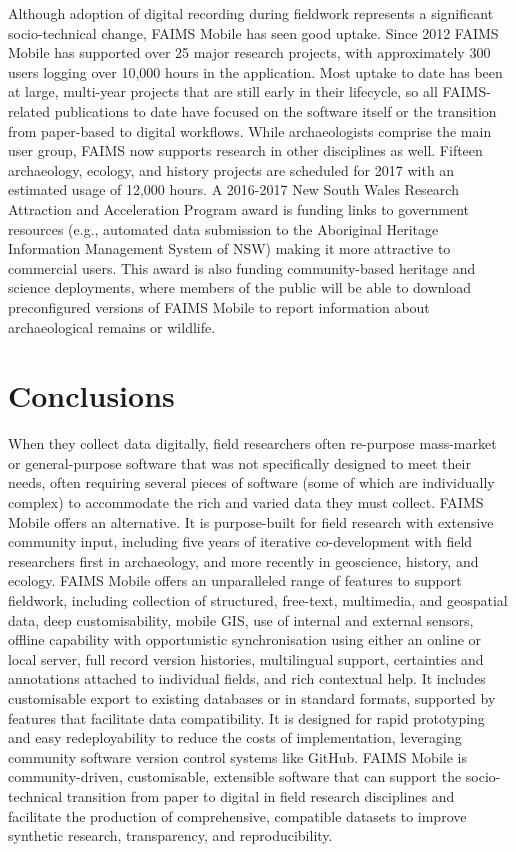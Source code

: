 \documentclass[preprint,12pt, a4paper]{elsarticle}
\begin{document}
Although adoption of digital recording during fieldwork represents a significant socio-technical change, FAIMS Mobile has seen good uptake. Since 2012 FAIMS Mobile has supported over 25 major research projects, with approximately 300 users logging over 10,000 hours in the application. Most uptake to date has been at large, multi-year projects that are still early in their lifecycle, so all FAIMS-related publications to date have focused on the software itself or the transition from paper-based to digital workflows. While archaeologists comprise the main user group, FAIMS now supports research in other disciplines as well. Fifteen archaeology, ecology, and history projects are scheduled for 2017 with an estimated usage of 12,000 hours. A 2016-2017 New South Wales Research Attraction and Acceleration Program award is funding links to government resources (e.g., automated data submission to the Aboriginal Heritage Information Management System of NSW) making it more attractive to commercial users. This award is also funding community-based heritage and science deployments, where members of the public will be able to download preconfigured versions of FAIMS Mobile to report information about archaeological remains or wildlife.

\section{Conclusions}
\label{}

When they collect data digitally, field researchers often re-purpose mass-market or general-purpose software that was not specifically designed to meet their needs, often requiring several pieces of software (some of which are individually complex) to accommodate the rich and varied data they must collect. FAIMS Mobile offers an alternative. It is purpose-built for field research with extensive community input, including five years of iterative co-development with field researchers first in archaeology, and more recently in geoscience, history, and ecology. FAIMS Mobile offers an unparalleled range of features to support fieldwork, including collection of structured, free-text, multimedia, and geospatial data, deep customisability, mobile GIS, use of internal and external sensors, offline capability with opportunistic synchronisation using either an online or local server, full record version histories, multilingual support, certainties and annotations attached to individual fields, and rich contextual help. It includes customisable export to existing databases or in standard formats, supported by features that facilitate data compatibility. It is designed for rapid prototyping and easy redeployability to reduce the costs of implementation, leveraging community software version control systems like GitHub.  FAIMS Mobile is community-driven, customisable, extensible software that can support the socio-technical transition from paper to digital in field research disciplines and facilitate the production of comprehensive, compatible datasets to improve synthetic research, transparency, and reproducibility.  
\end{document}
